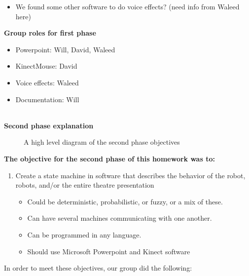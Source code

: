 \documentclass[12pt]{article}
\begin{document}
\begin{description}
\begin{itemize}
\begin{itemize}
				\end{itemize}
			\item We found some other software to do voice effects? (need info from Waleed here)
		\end{itemize}
		\textbf{Group roles for first phase}
		\begin{itemize}
			\item Powerpoint: Will, David, Waleed
			\item KinectMouse: David
			\item Voice effects: Waleed
			\item Documentation: Will
		\end{itemize} \hfill \\
		\newpage
		\textbf{Second phase explanation}
		\begin{figure}[H]
			\centering
			\caption{A high level diagram of the second phase objectives}
		\end{figure}
		\textbf{The objective for the second phase of this homework was to:}
		\begin{enumerate}
			\item Create a state machine in software that describes the behavior of the robot, robots, and/or the entire theatre presentation
				\begin{itemize}
					\item Could be deterministic, probabilistic, or fuzzy, or a mix of these.
					\item Can have several machines communicating with one another.
					\item Can be programmed in any language.
					\item Should use Microsoft Powerpoint and Kinect software
				\end{itemize} 
		\end{enumerate}
		In order to meet these objectives, our group did the following:

\end{description}
\end{document}
